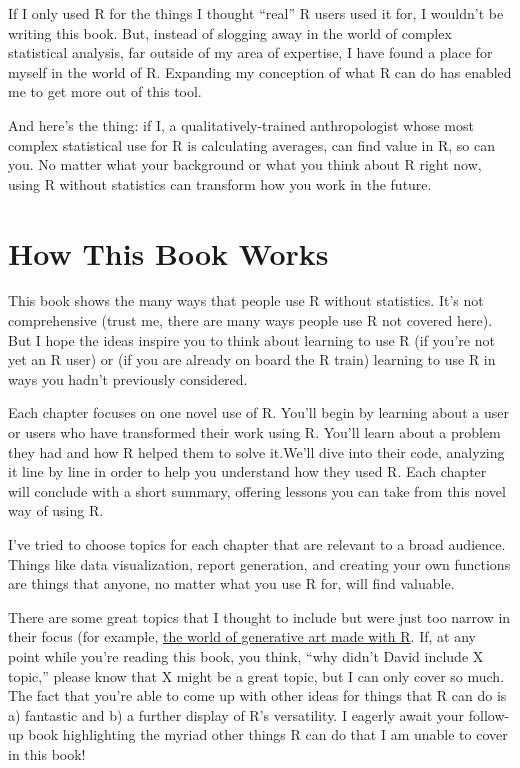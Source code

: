\documentclass[
]{book}
\begin{document}
If I only used R for the things I thought ``real'' R users used it for, I wouldn't be writing this book. But, instead of slogging away in the world of complex statistical analysis, far outside of my area of expertise, I have found a place for myself in the world of R. Expanding my conception of what R can do has enabled me to get more out of this tool.

And here's the thing: if I, a qualitatively-trained anthropologist whose most complex statistical use for R is calculating averages, can find value in R, so can you. No matter what your background or what you think about R right now, using R without statistics can transform how you work in the future.

\hypertarget{how-this-book-works}{%
\section{How This Book Works}\label{how-this-book-works}}

This book shows the many ways that people use R without statistics. It's not comprehensive (trust me, there are many ways people use R not covered here). But I hope the ideas inspire you to think about learning to use R (if you're not yet an R user) or (if you are already on board the R train) learning to use R in ways you hadn't previously considered.

Each chapter focuses on one novel use of R. You'll begin by learning about a user or users who have transformed their work using R. You'll learn about a problem they had and how R helped them to solve it.We'll dive into their code, analyzing it line by line in order to help you understand how they used R. Each chapter will conclude with a short summary, offering lessons you can take from this novel way of using R.

I've tried to choose topics for each chapter that are relevant to a broad audience. Things like data visualization, report generation, and creating your own functions are things that anyone, no matter what you use R for, will find valuable.

There are some great topics that I thought to include but were just too narrow in their focus (for example, \href{https://blog.djnavarro.net/posts/2021-10-19_rtistry-posts/}{the world of generative art made with R}. If, at any point while you're reading this book, you think, ``why didn't David include X topic,'' please know that X might be a great topic, but I can only cover so much. The fact that you're able to come up with other ideas for things that R can do is a) fantastic and b) a further display of R's versatility. I eagerly await your follow-up book highlighting the myriad other things R can do that I am unable to cover in this book!
\end{document}
